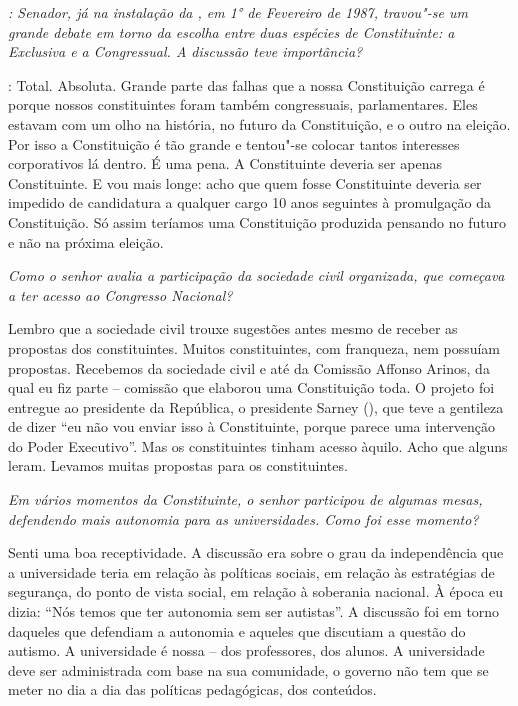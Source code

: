 \emph{: Senador, já na
instalação da , em 1° de Fevereiro de 1987,
travou"-se um grande debate em torno da escolha entre duas espécies de
Constituinte: a Exclusiva e a Congressual. A discussão teve
importância?}

: Total. Absoluta. Grande parte das falhas que a nossa
Constituição carrega é porque nossos constituintes foram também
congressuais, parlamentares. Eles estavam com um olho na história, no
futuro da Constituição, e o outro na eleição. Por isso a Constituição é
tão grande e tentou"-se colocar tantos interesses corporativos lá dentro.
É uma pena. A Constituinte deveria ser apenas Constituinte. E vou mais
longe: acho que quem fosse Constituinte deveria ser impedido de
candidatura a qualquer cargo 10 anos seguintes à promulgação da
Constituição. Só assim teríamos uma Constituição produzida pensando no
futuro e não na próxima eleição.

\medskip

\noindent\emph{Como o senhor avalia a participação da sociedade civil organizada, que
começava a ter acesso ao Congresso Nacional?}

Lembro que a sociedade civil trouxe sugestões antes
mesmo de receber as propostas dos constituintes. Muitos constituintes,
com franqueza, nem possuíam propostas. Recebemos da sociedade civil e
até da Comissão Affonso Arinos, da qual eu fiz parte -- comissão que
elaborou uma Constituição toda. O projeto foi entregue ao presidente da
República, o presidente Sarney (), que teve a gentileza de dizer
``eu não vou enviar isso à Constituinte, porque parece uma intervenção
do Poder Executivo''. Mas os constituintes tinham acesso àquilo. Acho
que alguns leram. Levamos muitas propostas para os constituintes.

\medskip

\noindent\emph{Em vários momentos da Constituinte, o senhor participou de
algumas mesas, defendendo mais autonomia para as universidades. Como foi
esse momento?}

Senti uma boa receptividade. A discussão era sobre o
grau da independência que a universidade teria em relação às políticas
sociais, em relação às estratégias de segurança, do ponto de vista
social, em relação à soberania nacional. À época eu dizia: ``Nós temos
que ter autonomia sem ser autistas''. A discussão foi em torno daqueles
que defendiam a autonomia e aqueles que discutiam a questão do
autismo. A universidade é nossa -- dos professores, dos alunos. A
universidade deve ser administrada com base na sua comunidade, o governo
não tem que se meter no dia a dia das políticas pedagógicas, dos
conteúdos.

